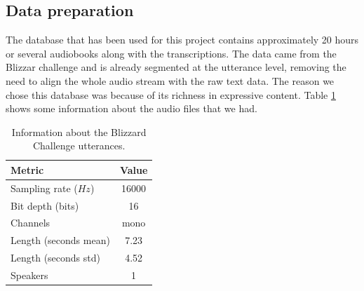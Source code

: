 

\subsection{Data preparation}


The database that has been used for this project contains approximately 20 hours or several audiobooks along with the transcriptions. The data came from the Blizzar challenge \cite{blizzard} and is already segmented at the utterance level, removing the need to align the whole audio stream with the raw text data. The reason we chose this database was because of its richness in expressive content. Table \ref{tab:blizard} shows some information about the audio files that we had.

\begin{table}[h]
    \centering
    \begin{tabular}{l|c}
        Metric & Value \\
        \hline
        Sampling rate ($Hz$) & 16000 \\
        Bit depth (bits) & 16 \\
        Channels & mono \\
        Length (seconds mean) & 7.23 \\
        Length (seconds std) & 4.52 \\
        Speakers & 1
    \end{tabular}
    \caption{Information about the Blizzard Challenge utterances.}
    \label{tab:blizard}
\end{table}

